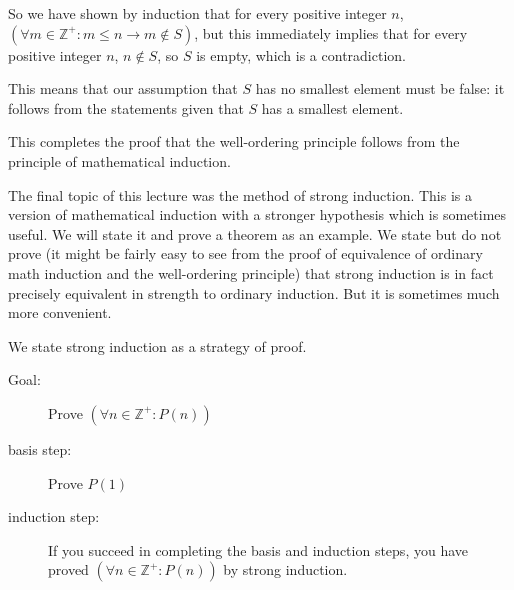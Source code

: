 \documentclass[12pt]{article}
\begin{document}
\begin{description}
So we have shown by induction that for every positive integer $n$, $(\forall m \in {\mathbb Z}^+: m \leq n \rightarrow m \not\in S)$, but this immediately implies that for every positive integer $n$, $n \not\in S$, so $S$ is empty, which is a contradiction.

This means that our assumption that $S$ has no smallest element must be false:  it follows from the statements given that $S$ has a smallest element.


\end{description}

This completes the proof that the well-ordering principle follows from the principle of mathematical induction. 

The final topic of this lecture was the method of strong induction.  This is a version of mathematical induction with a stronger hypothesis which is sometimes useful.  We will state it and prove a theorem as an example.  We state but do not prove (it might be fairly easy to see from the proof of equivalence of ordinary math induction and the well-ordering principle) that strong induction is in fact precisely equivalent in strength to ordinary induction.
But it is sometimes much more convenient.

We state strong induction as a strategy of proof.

\begin{description}
\item[Goal:]  Prove $(\forall n \in {\mathbb Z}^+:P(n))$

\item[basis step:]  Prove $P(1)$

\item[induction step:]

If you succeed in completing the basis and induction steps, you have proved $(\forall n \in {\mathbb Z}^+:P(n))$ by strong induction.

\end{description}
\end{document}
